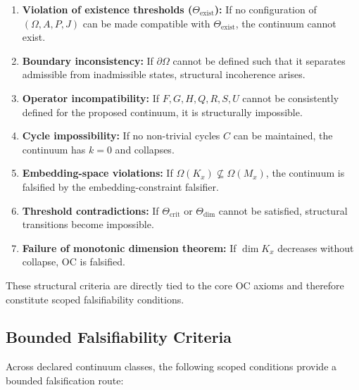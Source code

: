 \begin{enumerate}
    \item \textbf{Violation of existence thresholds ($\Theta_{\mathrm{exist}}$):}
          If no configuration of $(\Omega, A, P, J)$ can be made compatible
          with $\Theta_{\mathrm{exist}}$, the continuum cannot exist.

    \item \textbf{Boundary inconsistency:}
          If $\partial\Omega$ cannot be defined such that it separates
          admissible from inadmissible states, structural incoherence arises.

    \item \textbf{Operator incompatibility:}
          If $F, G, H, Q, R, S, U$ cannot be consistently defined for the
          proposed continuum, it is structurally impossible.

    \item \textbf{Cycle impossibility:}
          If no non-trivial cycles $C$ can be maintained, the continuum has
          $k=0$ and collapses.

    \item \textbf{Embedding-space violations:}
          If $\Omega(K_x) \not\subseteq \Omega(M_x)$, the continuum is
          falsified by the embedding-constraint falsifier.

    \item \textbf{Threshold contradictions:}
          If $\Theta_{\mathrm{crit}}$ or $\Theta_{\mathrm{dim}}$ cannot be
          satisfied, structural transitions become impossible.

    \item \textbf{Failure of monotonic dimension theorem:}
          If $\dim K_x$ decreases without collapse, OC is falsified.
\end{enumerate}

These structural criteria are directly tied to the core OC axioms and
therefore constitute scoped falsifiability conditions.



\subsection{Bounded Falsifiability Criteria}

Across declared continuum classes, the following scoped conditions provide
a bounded falsification route:

